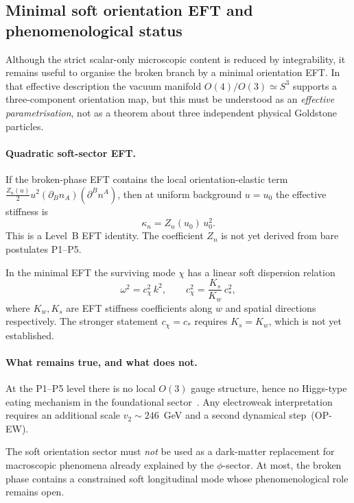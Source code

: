 \documentclass[11pt,a4paper]{article}
\numberwithin{equation}{section}
\begin{document}
\subsection{Minimal soft orientation EFT and phenomenological status}
\label{sec:goldstone_soft_eft}

Although the strict scalar-only microscopic content is reduced by
integrability, it remains useful to organise the broken branch by a
minimal orientation EFT.
In that effective description the vacuum manifold
$O(4)/O(3)\simeq S^3$ supports a three-component orientation map,
but this must be understood as an \emph{effective parametrisation},
not as a theorem about three independent physical Goldstone particles.

\paragraph{Quadratic soft-sector EFT.}
If the broken-phase EFT contains the local orientation-elastic term
$\frac{Z_n(u)}{2}u^2(\partial_B n_A)(\partial^B n^A)$,
then at uniform background $u=u_0$ the effective stiffness is
\begin{equation}
  \kappa_n = Z_n(u_0)\,u_0^2.
  \label{eq:kappa_n_main}
\end{equation}
This is a Level~B EFT identity.
The coefficient $Z_n$ is not yet derived from bare postulates P1--P5.

In the minimal EFT the surviving mode $\chi$ has a linear soft
dispersion relation
\begin{equation}
  \omega^2 = c_\chi^2\,k^2, \qquad
  c_\chi^2 = \frac{K_s}{K_w}\,c_*^2,
  \label{eq:chi_dispersion_main}
\end{equation}
where $K_w, K_s$ are EFT stiffness coefficients along $w$ and spatial
directions respectively.
The stronger statement $c_\chi=c_*$ requires $K_s=K_w$, which is not
yet established.

\paragraph{What remains true, and what does not.}
At the P1--P5 level there is no local $O(3)$ gauge structure, hence no
Higgs-type eating mechanism in the foundational
sector~\cite{GoldstoneSalamWeinberg1962}.
Any electroweak interpretation requires an additional scale
$v_2\sim246$~GeV and a second dynamical step~(OP-EW).

The soft orientation sector must \emph{not} be used as a dark-matter
replacement for macroscopic phenomena already explained by the
$\phi$-sector. At most, the broken phase contains a constrained soft
longitudinal mode whose phenomenological role remains open.
\end{document}
